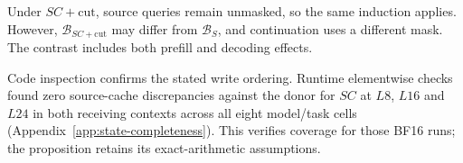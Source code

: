 Under $SC+\mathrm{cut}$, source queries remain unmasked, so the same
induction applies. However, $\mathcal B_{SC+\mathrm{cut}}$ may differ
from $\mathcal B_S$, and continuation uses a different mask. The contrast
includes both prefill and decoding effects.

Code inspection confirms the stated write ordering. Runtime elementwise
checks found zero source-cache discrepancies against the donor for $SC$
at $L8$, $L16$ and $L24$ in both receiving contexts across all eight
model/task cells (Appendix~\ref{app:state-completeness}). This verifies
coverage for those BF16 runs; the proposition retains its exact-arithmetic
assumptions.


